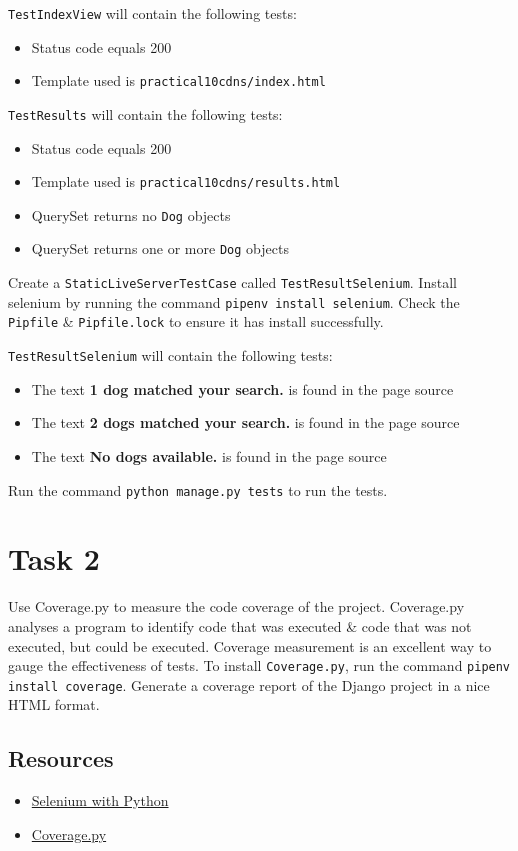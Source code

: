 \documentclass{article}
\begin{document}
\texttt{TestIndexView} will contain the following tests:
\begin{itemize}
  \item Status code equals 200
  \item Template used is \texttt{practical10cdns/index.html}
\end{itemize}

\texttt{TestResults} will contain the following tests:
\begin{itemize}
  \item Status code equals 200
  \item Template used is \texttt{practical10cdns/results.html}
  \item QuerySet returns no \texttt{Dog} objects
  \item QuerySet returns one or more \texttt{Dog} objects
\end{itemize}

Create a \texttt{StaticLiveServerTestCase} called \texttt{TestResultSelenium}. Install selenium by running the command \texttt{pipenv install selenium}. Check the \texttt{Pipfile} \& \texttt{Pipfile.lock} to ensure it has install successfully. 

\texttt{TestResultSelenium} will contain the following tests:
\begin{itemize}
  \item The text \textbf{1 dog matched your search.} is found in the page source
  \item The text \textbf{2 dogs matched your search.}  is found in the page source
  \item The text \textbf{No dogs available.} is found in the page source
\end{itemize}

Run the command \texttt{python manage.py tests} to run the tests.

\section*{Task 2} 
Use Coverage.py to measure the code coverage of the project. Coverage.py analyses a program to identify code that was executed \& code that was not executed, but could be executed. Coverage measurement is an excellent way to gauge the effectiveness of tests. To install \texttt{Coverage.py}, run the command \texttt{pipenv install coverage}. Generate a coverage report of the Django project in a nice HTML format. 

\subsection*{Resources} 
\begin{itemize}
  \item \href{https://selenium-python.readthedocs.io/}{Selenium with Python}
  \item \href{https://coverage.readthedocs.io/en/coverage-5.2.1/}{Coverage.py}
\end{itemize}
\end{document}
